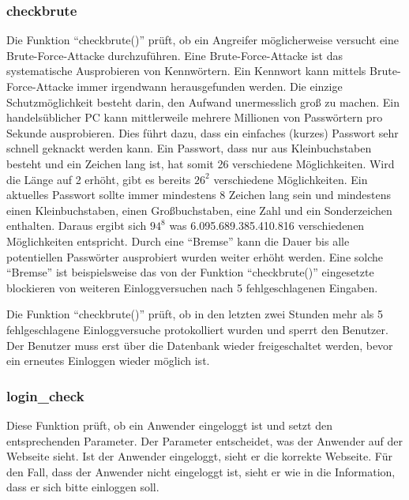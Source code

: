 \subsubsection{checkbrute}
Die Funktion "`checkbrute()"' prüft, ob  ein Angreifer möglicherweise versucht eine Brute-Force-Attacke durchzuführen. Eine Brute-Force-Attacke ist das systematische Ausprobieren von Kennwörtern. Ein Kennwort kann mittels Brute-Force-Attacke immer irgendwann herausgefunden werden. Die einzige Schutzmöglichkeit besteht darin, den Aufwand unermesslich groß zu machen. Ein handelsüblicher PC kann mittlerweile mehrere Millionen von Passwörtern pro Sekunde ausprobieren. Dies führt dazu, dass ein einfaches (kurzes) Passwort sehr schnell geknackt werden kann. Ein Passwort, dass nur aus Kleinbuchstaben besteht und ein Zeichen lang ist, hat somit 26 verschiedene Möglichkeiten. Wird die Länge auf 2 erhöht, gibt es bereits $26^2$ verschiedene Möglichkeiten. Ein aktuelles Passwort sollte immer mindestens 8 Zeichen lang sein und mindestens einen Kleinbuchstaben, einen Großbuchstaben, eine Zahl und ein Sonderzeichen enthalten. Daraus ergibt sich $94^8$ was 6.095.689.385.410.816 verschiedenen Möglichkeiten entspricht. Durch eine "`Bremse"' kann die Dauer bis alle potentiellen Passwörter ausprobiert wurden weiter erhöht werden. Eine solche "`Bremse"' ist beispielsweise das von der Funktion "`checkbrute()"' eingesetzte blockieren von weiteren Einloggversuchen nach 5 fehlgeschlagenen Eingaben.

Die Funktion "`checkbrute()"' prüft, ob in den letzten zwei Stunden mehr als 5 fehlgeschlagene Einloggversuche protokolliert wurden und sperrt den Benutzer. Der Benutzer muss erst über die Datenbank wieder freigeschaltet werden, bevor ein erneutes Einloggen wieder möglich ist.
\subsubsection{login\_check}
Diese Funktion prüft, ob ein Anwender eingeloggt ist und setzt den entsprechenden
Parameter. Der Parameter entscheidet, was der Anwender auf der Webseite sieht. Ist der Anwender eingeloggt, sieht er die korrekte Webseite. Für den Fall, dass der Anwender nicht eingeloggt ist, sieht er wie in  die Information, dass er sich bitte einloggen soll.


